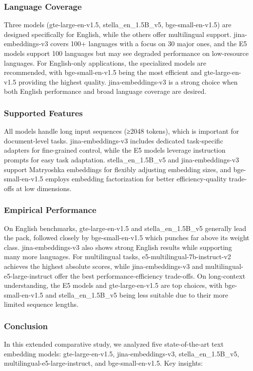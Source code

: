 \subsubsection{Language Coverage}
Three models (gte-large-en-v1.5, stella\_en\_1.5B\_v5, bge-small-en-v1.5) are designed specifically for English, while the others offer multilingual support. jina-embeddings-v3 covers 100+ languages with a focus on 30 major ones, and the E5 models support 100 languages but may see degraded performance on low-resource languages.
For English-only applications, the specialized models are recommended, with bge-small-en-v1.5 being the most efficient and gte-large-en-v1.5 providing the highest quality. jina-embeddings-v3 is a strong choice when both English performance and broad language coverage are desired.

\subsubsection{Supported Features}
All models handle long input sequences (≥2048 tokens), which is important for document-level tasks. jina-embeddings-v3 includes dedicated task-specific adapters for fine-grained control, while the E5 models leverage instruction prompts for easy task adaptation.
stella\_en\_1.5B\_v5 and jina-embeddings-v3 support Matryoshka embeddings for flexibly adjusting embedding sizes, and bge-small-en-v1.5 employs embedding factorization for better efficiency-quality trade-offs at low dimensions.

\subsubsection{Empirical Performance}
On English benchmarks, gte-large-en-v1.5 and stella\_en\_1.5B\_v5 generally lead the pack, followed closely by bge-small-en-v1.5 which punches far above its weight class. jina-embeddings-v3 also shows strong English results while supporting many more languages.
For multilingual tasks, e5-multilingual-7b-instruct-v2 achieves the highest absolute scores, while jina-embeddings-v3 and multilingual-e5-large-instruct offer the best performance-efficiency trade-offs.
On long-context understanding, the E5 models and gte-large-en-v1.5 are top choices, with bge-small-en-v1.5 and stella\_en\_1.5B\_v5 being less suitable due to their more limited sequence lengths.

\subsubsection{Conclusion}
In this extended comparative study, we analyzed five state-of-the-art text embedding models: gte-large-en-v1.5, jina-embeddings-v3, stella\_en\_1.5B\_v5, multilingual-e5-large-instruct, and bge-small-en-v1.5.
Key insights:

